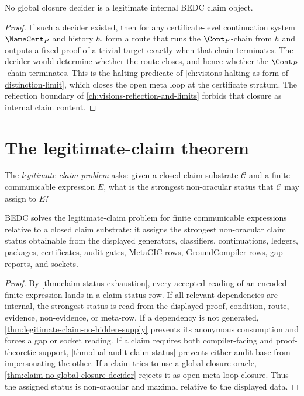 \begin{theorem}
\label{thm:claim-no-global-closure-decider}
No global closure decider is a legitimate internal BEDC claim object.
\end{theorem}

\begin{proof}
If such a decider existed, then for any certificate-level continuation
system $\NameCert_P$ and history $h$, form a route that runs the
$\Cont_P$-chain from $h$ and outputs a fixed proof of a trivial target
exactly when that chain terminates.  The decider would determine whether
the route closes, and hence whether the $\Cont_P$-chain terminates.  This
is the halting predicate of
\autoref{ch:visions-halting-as-form-of-distinction-limit}, which closes the
open meta loop at the certificate stratum.  The reflection boundary of
\autoref{ch:visions-reflection-and-limits} forbids that closure as internal
claim content.
\end{proof}

\section{The legitimate-claim theorem}
\label{sec:legitimate-claim-theorem}

\begin{definition}
\label{def:legitimate-claim-problem}
The \emph{legitimate-claim problem} asks: given a closed claim substrate
$\mathcal C$ and a finite communicable expression $E$, what is the strongest
non-oracular status that $\mathcal C$ may assign to $E$?
\end{definition}

\begin{theorem}
\label{thm:legitimate-claim-theorem}
BEDC solves the legitimate-claim problem for finite communicable
expressions relative to a closed claim substrate: it assigns the strongest
non-oracular claim status obtainable from the displayed generators,
classifiers, continuations, ledgers, packages, certificates, audit gates,
MetaCIC rows, GroundCompiler rows, gap reports, and sockets.
\end{theorem}

\begin{proof}
By \autoref{thm:claim-status-exhaustion}, every accepted reading of an
encoded finite expression lands in a claim-status row.  If all relevant
dependencies are internal, the strongest status is read from the displayed
proof, condition, route, evidence, non-evidence, or meta-row.  If a
dependency is not generated, \autoref{thm:legitimate-claim-no-hidden-supply}
prevents its anonymous consumption and forces a gap or socket reading.  If a
claim requires both compiler-facing and proof-theoretic support,
\autoref{thm:dual-audit-claim-status} prevents either audit base from
impersonating the other.  If a claim tries to use a global closure oracle,
\autoref{thm:claim-no-global-closure-decider} rejects it as open-meta-loop
closure.  Thus the assigned status is non-oracular and maximal relative to
the displayed data.
\end{proof}


